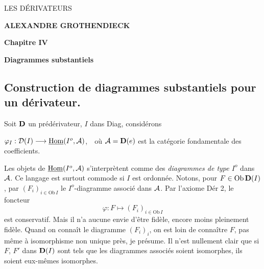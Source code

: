 \printedpage{}%

\begin{center}
{\LARGE\textsf{LES DÉRIVATEURS}}

\bigskip

\textbf{ALEXANDRE GROTHENDIECK}

\bigskip\bigskip

\textbf{Chapitre IV}

\medskip

\textbf{Diagrammes substantiels}
\end{center}

\clearpage

\printedpage{}%


\clearpage


\noindent


\subsection*{Construction de diagrammes substantiels pour un dérivateur.}

\noindent Soit $\mathbf{D}$ un prédérivateur, $I$ dans Diag, considérons

\noindent $\varphi_I : \mathcal{D}(I) \longrightarrow \underline{\mathrm{Hom}}(I^o,\mathcal{A})$,\ \ où $\mathcal{A}=\mathbf{D}(e)$ est la catégorie fondamentale des coefficients. %

Les objets de $\underline{\mathrm{Hom}}(I^o,\mathcal{A})$ s'interprètent comme des \textit{diagrammes de type $I^o$} dans $\mathcal{A}$. Ce langage est surtout commode si $I$ est ordonnée. Notons, pour $F\in\mathrm{Ob}\,\mathbf{D}(I)$, par $(F_i)_{i\in\mathrm{Ob}\,I}$ le $I^o$-diagramme associé dans $\mathcal{A}$. Par l'axiome Dér 2, le foncteur
\[
\varphi : F \longmapsto (F_i)_{i\in\mathrm{Ob}\,I}
\]
est conservatif. Mais il n'a aucune envie d'être fidèle, encore moins pleinement fidèle. Quand on connaît le diagramme $(F_i)_i$, on est loin de connaître $F$, pas même à isomorphisme non unique près, je présume. Il n'est nullement clair que si $F$, $F'$ dans $\mathbf{D}(I)$ sont tels que les diagrammes associés soient isomorphes, ils soient eux-mêmes isomorphes.


